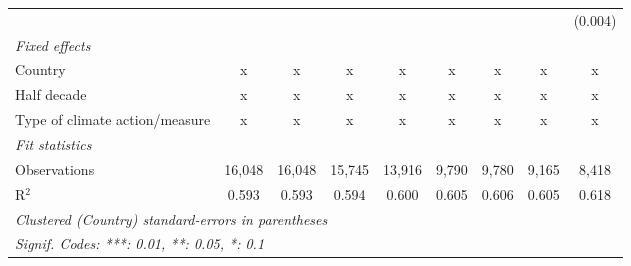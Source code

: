 \begin{tabular}{lcccccccc}
                                                              &                &                &                &                &                &                &                & (0.004)\\   
   \emph{Fixed effects}\\
   Country                                                    & x              & x              & x              & x              & x              & x              & x              & x\\  
   Half decade                                                & x              & x              & x              & x              & x              & x              & x              & x\\  
   Type of climate action/measure                             & x              & x              & x              & x              & x              & x              & x              & x\\  
   \midrule \emph{Fit statistics}\\
   Observations                                               & 16,048         & 16,048         & 15,745         & 13,916         & 9,790          & 9,780          & 9,165          & 8,418\\  
   R$^2$                                                      & 0.593          & 0.593          & 0.594          & 0.600          & 0.605          & 0.606          & 0.605          & 0.618\\  
   \midrule
   \multicolumn{9}{l}{\emph{Clustered (Country) standard-errors in parentheses}}\\
   \multicolumn{9}{l}{\emph{Signif. Codes: ***: 0.01, **: 0.05, *: 0.1}}\\
\end{tabular}
\par\endgroup


